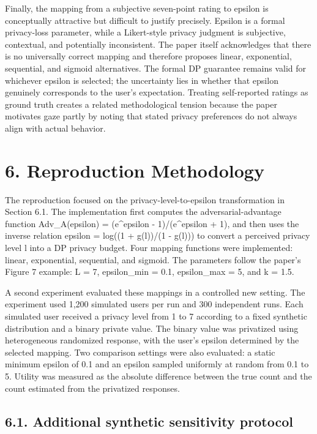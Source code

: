 \documentclass[11pt,a4paper]{article}
\begin{document}
Finally, the mapping from a subjective seven-point rating to epsilon is conceptually attractive but difficult to justify precisely. Epsilon is a formal privacy-loss parameter, while a Likert-style privacy judgment is subjective, contextual, and potentially inconsistent. The paper itself acknowledges that there is no universally correct mapping and therefore proposes linear, exponential, sequential, and sigmoid alternatives. The formal DP guarantee remains valid for whichever epsilon is selected; the uncertainty lies in whether that epsilon genuinely corresponds to the user's expectation. Treating self-reported ratings as ground truth creates a related methodological tension because the paper motivates gaze partly by noting that stated privacy preferences do not always align with actual behavior.


\section*{6. Reproduction Methodology}

The reproduction focused on the privacy-level-to-epsilon transformation in Section 6.1. The implementation first computes the adversarial-advantage function Adv\_A(epsilon) = (e\textasciicircum{}epsilon - 1)/(e\textasciicircum{}epsilon + 1), and then uses the inverse relation epsilon = log((1 + g(l))/(1 - g(l))) to convert a perceived privacy level l into a DP privacy budget. Four mapping functions were implemented: linear, exponential, sequential, and sigmoid. The parameters follow the paper's Figure 7 example: L = 7, epsilon\_min = 0.1, epsilon\_max = 5, and k = 1.5.


A second experiment evaluated these mappings in a controlled new setting. The experiment used 1,200 simulated users per run and 300 independent runs. Each simulated user received a privacy level from 1 to 7 according to a fixed synthetic distribution and a binary private value. The binary value was privatized using heterogeneous randomized response, with the user's epsilon determined by the selected mapping. Two comparison settings were also evaluated: a static minimum epsilon of 0.1 and an epsilon sampled uniformly at random from 0.1 to 5. Utility was measured as the absolute difference between the true count and the count estimated from the privatized responses.


\subsection*{6.1. Additional synthetic sensitivity protocol}
\end{document}
